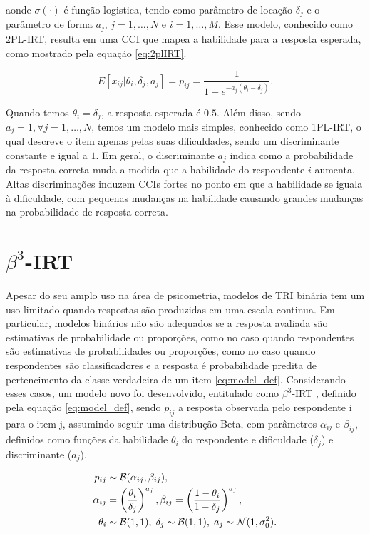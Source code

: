 \noindent aonde $\sigma(\cdot)$ é função logistica, tendo como parâmetro de locação $\delta_j$ e o parâmetro de forma $a_j$, $j=1,\ldots,N$ e $i=1,\ldots,M$. Esse modelo, conhecido como \gls{2PL-IRT}, resulta em uma \gls{CCI} que mapea a habilidade para a resposta esperada, como mostrado pela equação \ref{eq:2plIRT}.

\begin{equation}
\label{eq:2plIRT}
    E[x_{ij}|\theta_i,\delta_j,a_j] = p_{ij} = \frac{1}{1+e^{-a_j(\theta_i-\delta_j)}}.
\end{equation}

Quando temos $\theta_i = \delta_j$, a resposta esperada é $0.5$. Além disso, sendo $a_j=1, \forall j=1,\ldots,N$, temos um modelo mais simples, conhecido como \gls{1PL-IRT}, o qual descreve o item apenas pelas suas dificuldades, sendo um discriminante constante e igual a $1$. Em geral, o discriminante $a_j$ indica como a probabilidade da resposta correta muda a medida que a habilidade do respondente $i$ aumenta. Altas discriminações induzem \gls{CCI}s fortes no ponto em que a habilidade se iguala à dificuldade, com pequenas mudanças na habilidade causando grandes mudanças na probabilidade de resposta correta.

\section{$\beta^{3}$-\gls{IRT}}
\label{sec:irt:beta3}

Apesar do seu amplo uso na área de psicometria, modelos de \gls{TRI} binária tem um uso limitado quando respostas são produzidas em uma escala continua. Em particular, modelos binários não são adequados se a resposta avaliada são estimativas de probabilidade ou proporções, como no caso quando respondentes são estimativas de probabilidades ou proporções, como no caso quando respondentes são classificadores e a resposta é probabilidade predita de pertencimento da classe verdadeira de um item \ref{eq:model_def}. Considerando esses casos, um modelo novo foi desenvolvido, entitulado como $\beta^3$-\gls{IRT} \cite{chen2019birt}, definido pela equação \ref{eq:model_def}, sendo $p_{ij}$ a resposta observada pelo respondente i para o item j, assumindo seguir uma distribução Beta, com parâmetros $\alpha_{ij}$ e $\beta_{ij}$, definidos como funções da habilidade $\theta_i$ do respondente e dificuldade ($\delta_j$) e discriminante ($a_j$).

\begin{align} \label{eq:model_def}
    p_{ij} & \sim {\mathcal{B}}(\alpha_{ij}, \beta_{ij}), \notag \\
    \alpha_{ij} & = 
    \left(\frac{\theta_i}{\delta_j}\right)^{a_j}, \notag 
    \beta_{ij} = 
    \left(\frac{1-\theta_i}{1-\delta_j}\right)^{a_j}, \notag \\
    \theta_i & \sim {\mathcal{B}}(1,1),\;
    \delta_j \sim {\mathcal{B}}(1,1),\;
    a_j \sim \mathcal{N}(1, \sigma^2_{0}).
\end{align}

